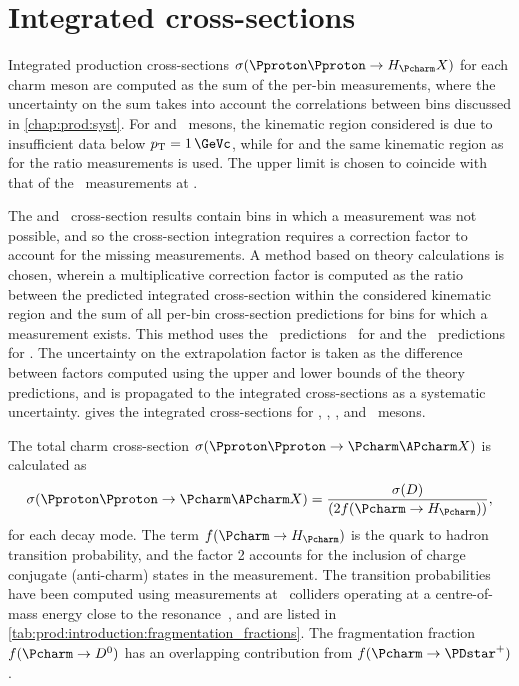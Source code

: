 \section{Integrated cross-sections}
\label{chap:prod:results:integrated}

Integrated production cross-sections $\xsec(\ppToHc{}X)$ for each charm meson
are computed as the sum of the per-bin measurements, where the uncertainty on
the sum takes into account the correlations between bins discussed in
\cref{chap:prod:syst}.
For \PDsplus and \PDstarp\ mesons, the kinematic region considered is
 due to insufficient data below $\pT = \SI{1}{\GeVc}$,
while for \PDzero and \PDplus the same kinematic region as for the ratio
measurements is used.
The upper limit is chosen to coincide with that of the \lhcb\ measurements at
.

The \PDzero and \PDstarp\ cross-section results contain bins in which a
measurement was not possible, and so the cross-section integration requires a
correction factor to account for the missing measurements.
A method based on theory calculations is chosen, wherein a multiplicative
correction factor is computed as the ratio between the predicted integrated
cross-section within the considered kinematic region and the sum of all per-bin
cross-section predictions for bins for which a measurement exists.
This method uses the \nnpdfl\ predictions~\cite{Gauld:2015yia} for \PDzero and
the \fonll\ predictions~\cite{Cacciari:2015fta} for \PDstarp.
The uncertainty on the extrapolation factor is taken as the difference between
factors computed using the upper and lower bounds of the theory predictions,
and is propagated to the integrated cross-sections as a systematic uncertainty.
 gives the integrated
cross-sections for \PDzero, \PDplus, \PDsplus, and \PDstarp\ mesons.

The total charm cross-section $\xsec(\ppToccbarX)$ is calculated as
\begin{equation}
  \xsec(\ppToccbarX) = \frac{\xsec(D)}{(2f(\cToHc))},
\end{equation}
for each decay mode.
The term $f(\cToHc)$ is the quark to hadron transition probability, and the
factor 2 accounts for the inclusion of charge conjugate (anti-charm) states in
the measurement.
The transition probabilities have been computed using measurements at \epem\
colliders operating at a centre-of-mass energy close to the \PUpsilonFourS
resonance~\cite{PDG2008}, and are listed in
\cref{tab:prod:introduction:fragmentation_fractions}.
The fragmentation fraction $f(\decay{\Pcharm}{\PDzero})$ has an overlapping
contribution
from $f(\decay{\Pcharm}{\PDstarp})$.

